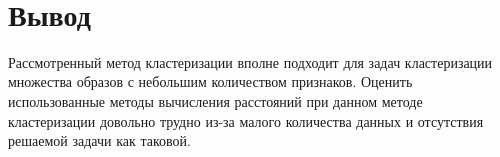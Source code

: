 \documentclass[12pt,a4paper]{article}
\begin{document}
    \begin{center}
    \end{center}
    { \hspace*{\fill} \\}
    
    \section{Вывод}\label{ux432ux44bux432ux43eux434}

Рассмотренный метод кластеризации вполне подходит для задач
кластеризации множества образов с небольшим количеством признаков.
Оценить использованные методы вычисления расстояний при данном методе
кластеризации довольно трудно из-за малого количества данных и
отсутствия решаемой задачи как таковой.


    
    
    
    
\end{document}
